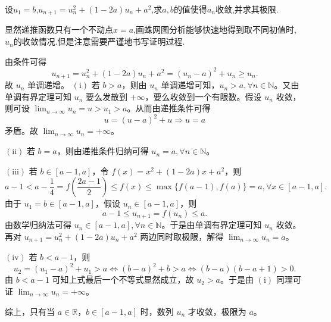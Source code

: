 \documentclass[../../main.tex]{subfiles}
\begin{document}
\begin{example}
设\(u_1 = b\),\(u_{n + 1}=u_{n}^{2}+(1 - 2a)u_{n}+a^{2}\),求$a,b$的值使得$a_n$收敛,并求其极限.
\end{example}
\begin{note}
显然递推函数只有一个不动点$x=a$,画蛛网图分析能够快速地得到取不同初值时,$u_n$的收敛情况.但是注意需要严谨地书写证明过程.
\end{note}
\begin{solution}
由条件可得
\[
u_{n + 1}=u_{n}^{2}+(1 - 2a)u_n + a^2=(u_n - a)^2 + u_n\geqslant u_n.
\]
故 \(u_n\) 单调递增。 
\((\mathrm{i})\) 若 \(b > a\)，则由 \(u_n\) 单调递增可知，\(u_n > a,\forall n\in \mathbb{N}\)。又由单调有界定理可知 \(u_n\) 要么发散到 \(+\infty\)，要么收敛到一个有限数。假设 \(u_n\) 收敛，则可设 \(\lim_{n\rightarrow \infty}u_n = u > u_1 > a\)。从而由递推条件可得
\[
u=(u - a)^2 + u\Rightarrow u = a
\]
矛盾。故 \(\lim_{n\rightarrow \infty}u_n = +\infty\)。

\((\mathrm{ii})\) 若 \(b = a\)，则由递推条件归纳可得 \(u_n = a,\forall n\in \mathbb{N}\)。

\((\mathrm{iii})\) 若 \(b\in [a - 1,a]\)，令 \(f(x)=x^2+(1 - 2a)x + a^2\)，则
\[
a - 1 < a - \frac{1}{4}=f\left(\frac{2a - 1}{2}\right)\leqslant f(x)\leqslant \max\{f(a - 1),f(a)\}=a,\forall x\in [a - 1,a].
\]
由于 \(u_1 = b\in [a - 1,a]\)，假设 \(u_n\in [a - 1,a]\)，则
\[
a - 1\leqslant u_{n + 1}=f(u_n)\leqslant a.
\]
由数学归纳法可得 \(u_n\in [a - 1,a],\forall n\in \mathbb{N}\)。于是由单调有界定理可知 \(u_n\) 收敛。再对 \(u_{n + 1}=u_{n}^{2}+(1 - 2a)u_n + a^2\) 两边同时取极限，解得 \(\lim_{n\rightarrow \infty}u_n = a\)。

\((\mathrm{iv})\) 若 \(b < a - 1\)，则
\[
u_2=(u_1 - a)^2 + u_1 > a\Leftrightarrow (b - a)^2 + b > a\Leftrightarrow (b - a)(b - a + 1) > 0.
\]
由 \(b < a - 1\) 可知上式最后一个不等式显然成立，故 \(u_2 > a\)。于是由 \((\mathrm{i})\) 同理可证 \(\lim_{n\rightarrow \infty}u_n = +\infty\)。

综上，只有当 \(a\in \mathbb{R}\)，\(b\in [a - 1,a]\) 时，数列 \(u_n\) 才收敛，极限为 \(a\)。

\end{solution}
\end{document}

